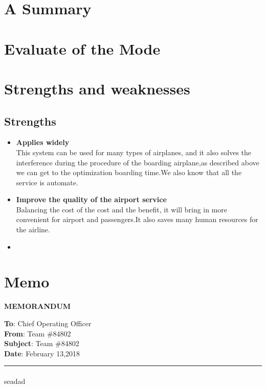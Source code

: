 \documentclass{mcmthesis}
\begin{document}
\section{A Summary}
\lipsum[6]

\section{Evaluate of the Mode}

\section{Strengths and weaknesses}
\lipsum[12]

\subsection{Strengths}
\begin{itemize}
\item \textbf{Applies widely}\\
This  system can be used for many types of airplanes, and it also
solves the interference during  the procedure of the boarding
airplane,as described above we can get to the  optimization
boarding time.We also know that all the service is automate.
\item \textbf{Improve the quality of the airport service}\\
Balancing the cost of the cost and the benefit, it will bring in
more convenient  for airport and passengers.It also saves many
human resources for the airline. \item \textbf{}
\end{itemize}
\cite{chicago}
\newpage 
\section{Memo}
\begin{center}
\large {\textbf {MEMORANDUM}}
\end{center}
\textbf {To}: Chief Operating Officer \\
\textbf {From}: Team \#84802 \\
\textbf {Subject}: Team \#84802 \\
\textbf {Date}: February 13,2018 \\
\noindent\rule[0.25\baselineskip]{\textwidth}{1pt}
\paragraph{} seadad
\end{document}
